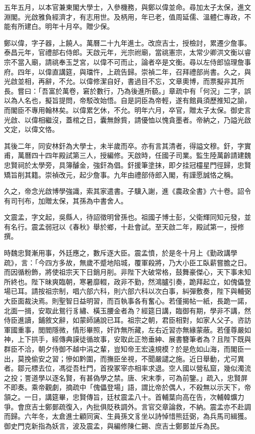 \begin{pinyinscope}
五年五月，以本官兼東閣大學士，入參機務，與鄭以偉並命。尋加太子太保，進文淵閣。光啟雅負經濟才，有志用世。及柄用，年已老，值周延儒、溫體仁專政，不能有所建白。明年十月卒。贈少保。

鄭以偉，字子器，上饒人。萬曆二十九年進士。改庶吉士，授檢討，累遷少詹事。泰昌元年，官禮部右侍郎。天啟元年，光宗祔廟，當祧憲宗，太常少卿洪文衡以睿宗不當入廟，請祧奉玉芝宮，以偉不可而止，論者卒是文衡。尋以左侍郎協理詹事府。四年，以偉直講筵，與璫忤，上疏告歸。崇禎二年，召拜禮部尚書。久之，與光啟並相，再辭，不允。以偉修潔自好，書過目不忘，文章奧博，而票擬非其所長。嘗曰：「吾富於萬卷，窘於數行，乃為後進所藐。」章疏中有「何況」二字，誤以為人名也，擬旨提問，帝駁改始悟。自是詞臣為帝輕，遂有館員須歷推知之諭，而閣臣不專用翰林矣。以偉累乞休，不允。明年六月，卒官，贈太子太保。御史言光啟、以偉相繼沒，蓋棺之日，囊無餘貲，請優恤以愧貪墨者。帝納之，乃謚光啟文定，以偉文恪。

其後二年，同安林釬為大學士，未半歲而卒。亦有言其清者，得謚文穆。釬，字實甫，萬曆四十四年殿試第三人，授編修。天啟時，任國子司業。監生陸萬齡請建魏忠賢祠於太學旁，具簿醵金，強釬為倡。釬援筆塗抹，即夕挂冠欞星門徑歸，忠賢矯旨削其籍。崇禎改元，起少詹事。九年由禮部侍郎入閣，有謹愿誠恪之稱。

久之，帝念光啟博學強識，索其家遣書。子驥入謝，進《農政全書》六十卷。詔令有司刊布，加贈太保，其孫為中書舍人。

文震孟，字文起，吳縣人，待詔徵明曾孫也。祖國子博士彭，父衛輝同知元發，並有名行。震孟弱冠以《春秋》舉於鄉，十赴會試。至天啟二年，殿試第一，授修撰。

時魏忠賢漸用事，外廷應之，數斥逐大臣。震孟憤，於是冬十月上《勤政講學疏》，言：「今四方多故，無歲不蹙地陷城，覆軍殺將，乃大小臣工臥薪嘗膽之日。而因循粉飾，將使祖宗天下日銷月削。非陛下大破常格，鼓舞豪傑心，天下事未知所終也。陛下昧爽臨朝，寒暑靡輟，政非不勤，然鴻臚引奏，跪拜起立，如傀儡登場已耳。請按祖宗制，唱六部六科，則六部六科以次白事，糾彈敷奏，陛下與輔弼大臣面裁決焉。則聖智日益明習，而百執事各有奮心。若僅揭帖一紙，長跪一諾，北面一揖，安取此鴛行豸繡、橫玉腰金者為？經筵日講，臨御有期，學非不講，然侍臣進讀，鋪敘文辭，如蒙師誦說已耳。祖宗之朝，君臣相對，如家人父子。咨訪軍國重事，閭閻隱微，情形畢照，奸詐無所藏，左右近習亦無緣蒙蔽。若僅尊嚴如神，上下拱手，經傳典謨徒循故事，安取此正笏垂紳、展書簪筆者為？且陛下既與群臣不洽，朝夕侍御不越中涓之輩，豈知帝王宏遠規模？於是危如山海，而閣臣一出，莫挽偷安之習；慘如黔圍，而撫臣坐視，不聞嚴譴之施。近日舉動，尤可異者。鄒元標去位，馮從吾杜門，首揆冢宰亦相率求退。空人國以營私窟，幾似濁流之投；詈道學以逐名賢，有甚偽學之禁。唐、宋末季，可為前鑒。」疏入，忠賢屏不即奏。乘帝觀劇，摘疏中「傀儡登場」語，謂比帝於偶人，不殺無以示天下，帝頷之。一日，講筵畢，忠賢傳旨，廷杖震孟八十。首輔葉向高在告，次輔韓爌力爭。會庶吉士鄭鄤疏復入，內批俱貶秩調外。言官交章論救，不納。震孟亦不赴調而歸。六年冬，太倉進士顧同寅、生員孫文豸坐以詩悼惜熊廷弼，為兵馬司緝獲。御史門克新指為妖言，波及震孟，與編修陳仁錫、庶吉士鄭鄤並斥為民。


\end{pinyinscope}
